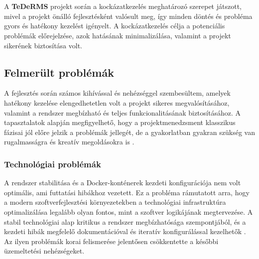 \chapter{\riskproblem}

A \textbf{TeDeRMS} projekt során a kockázatkezelés meghatározó szerepet játszott, 
mivel a projekt önálló fejlesztésként valósult meg, így minden döntés és probléma gyors és hatékony kezelést igényelt. 
A kockázatkezelés célja a potenciális problémák előrejelzése, azok hatásának minimalizálása, 
valamint a projekt sikerének biztosítása volt.

\section{Felmerült problémák}

A fejlesztés során számos kihívással és nehézséggel szembesültem, amelyek hatékony kezelése elengedhetetlen volt a projekt sikeres megvalósításához, 
valamint a rendszer megbízható és teljes funkcionalitásának biztosításához.
A tapasztalatok alapján megfigyelhető, hogy a projektmenedzsment klasszikus fázisai jól előre jelzik a 
problémák jellegét, de a gyakorlatban gyakran szükség van rugalmasságra és kreatív megoldásokra is \cite{Hajdu2014,Szalay2018}.

\subsection{Technológiai problémák}
A rendszer stabilitása és a Docker-konténerek kezdeti konfigurációja nem volt optimális, ami futtatási hibákhoz vezetett.
Ez a probléma rámutatott arra, hogy a modern szoftverfejlesztési környezetekben a technológiai infrastruktúra 
optimalizálása legalább olyan fontos, mint a szoftver logikájának megtervezése. 
A stabil technológiai alap kritikus a rendszer megbízhatósága szempontjából, 
és a kezdeti hibák megfelelő dokumentációval és iteratív konfigurálással kezelhetők \cite{Kovacs2016,Kaposi2019}. 
Az ilyen problémák korai felismerése jelentősen csökkentette a későbbi üzemeltetési nehézségeket.

